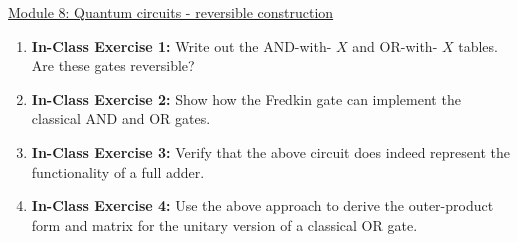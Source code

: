 \documentclass[main.tex]{subfiles}
\begin{document}
\href{https://www2.seas.gwu.edu/~simhaweb/quantum/modules/module8/module8.html}{Module 8: Quantum circuits - reversible construction}\\

\begin{enumerate}

\item[] \textbf{In-Class Exercise 1:} Write out the AND-with- $X$ and OR-with- $X$ tables. Are these gates reversible?

\item[] \textbf{In-Class Exercise 2:} Show how the Fredkin gate can implement the classical AND and OR gates.

\item[] \textbf{In-Class Exercise 3:} Verify that the above circuit does indeed represent the functionality of a full adder.

\item[] \textbf{In-Class Exercise 4:} Use the above approach to derive the outer-product form and matrix for the unitary version of a classical OR gate.

\end{enumerate}
\end{document}
